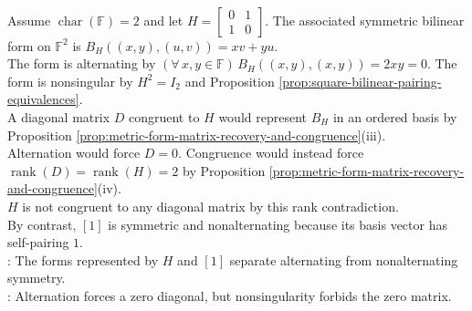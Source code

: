 \begin{example} \label{ex:characteristic-two-alternating-versus-nonalternating-symmetric} \\
Assume $\operatorname{char}(\mathbb{F})=2$ and let $H=\left[\begin{smallmatrix}0&1\\1&0\end{smallmatrix}\right]$. The associated symmetric bilinear form on $\mathbb{F}^2$ is $B_H((x,y),(u,v))=xv+yu$.\\
The form is alternating by $(\forall\,x,y\in\mathbb{F})\,B_H((x,y),(x,y))=2xy=0$. The form is nonsingular by $H^2=I_2$ and Proposition \ref{prop:square-bilinear-pairing-equivalences}.\\
A diagonal matrix $D$ congruent to $H$ would represent $B_H$ in an ordered basis by Proposition \ref{prop:metric-form-matrix-recovery-and-congruence}(iii).\\
Alternation would force $D=0$. Congruence would instead force $\operatorname{rank}(D)=\operatorname{rank}(H)=2$ by Proposition \ref{prop:metric-form-matrix-recovery-and-congruence}(iv).\\
$H$ is not congruent to any diagonal matrix by this rank contradiction.\\
By contrast, $[1]$ is symmetric and nonalternating because its basis vector has self-pairing $1$.\\
: The forms represented by $H$ and $[1]$ separate alternating from nonalternating symmetry.\\
: Alternation forces a zero diagonal, but nonsingularity forbids the zero matrix.
\end{example}
